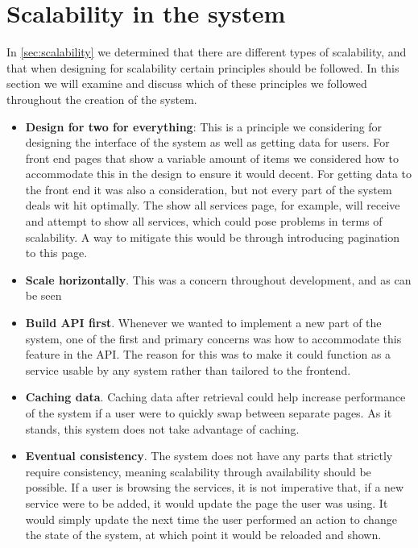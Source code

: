 \section{Scalability in the system}
In \autoref{sec:scalability} we determined that there are different types of scalability, and that when designing for scalability certain principles should be followed.
In this section we will examine and discuss which of these principles we followed throughout the creation of the system.

\begin{itemize}
    \item \textbf{Design for two for everything}: This is a principle we considering for designing the interface of the system as well as getting data for users.
    For front end pages that show a variable amount of items we considered how to accommodate this in the design to ensure it would decent.
    For getting data to the front end it was also a consideration, but not every part of the system deals wit hit optimally.
    The show all services page, for example, will receive and attempt to show all services, which could pose problems in terms of scalability.
    A way to mitigate this would be through introducing pagination to this page.
    \item \textbf{Scale horizontally}. This was a concern throughout development, and as can be seen 
    \item \textbf{Build API first}. Whenever we wanted to implement a new part of the system, one of the first and primary concerns was how to accommodate this feature in the API.
    The reason for this was to make it could function as a service usable by any system rather than tailored to the frontend. 
    \item \textbf{Caching data}. Caching data after retrieval could help increase performance of the system if a user were to quickly swap between separate pages. 
    As it stands, this system does not take advantage of caching.
    \item \textbf{Eventual consistency}. The system does not have any parts that strictly require consistency, meaning scalability through availability should be possible. 
    If a user is browsing the services, it is not imperative that, if a new service were to be added, it would update the page the user was using.
    It would simply update the next time the user performed an action to change the state of the system, at which point it would be reloaded and shown.

\end{itemize}
